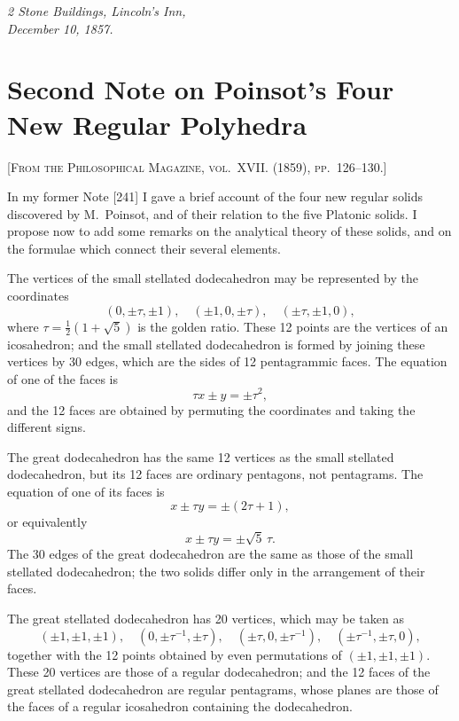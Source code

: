 \documentclass[11pt,a4paper]{book}
\begin{document}
\medskip
\noindent\textit{2 Stone Buildings, Lincoln's Inn,\\December 10, 1857.}

\newpage



\section{Second Note on Poinsot's Four New Regular Polyhedra}

\textsc{[From the Philosophical Magazine, vol.~XVII. (1859), pp.~126--130.]}
\label{paper:242}

\setcounter{page}{86}

In my former Note [241] I gave a brief account of the four new regular solids discovered by M.~Poinsot, and of their relation to the five Platonic solids. I propose now to add some remarks on the analytical theory of these solids, and on the formulae which connect their several elements.

The vertices of the small stellated dodecahedron may be represented by the coordinates
\[
(0, \pm\tau, \pm1), \quad (\pm1, 0, \pm\tau), \quad (\pm\tau, \pm1, 0),
\]
where $\tau = \frac{1}{2}(1+\sqrt{5})$ is the golden ratio. These 12 points are the vertices of an icosahedron; and the small stellated dodecahedron is formed by joining these vertices by 30 edges, which are the sides of 12 pentagrammic faces. The equation of one of the faces is
\[
\tau x \pm y = \pm\tau^2,
\]
and the 12 faces are obtained by permuting the coordinates and taking the different signs.

\setcounter{page}{87}

The great dodecahedron has the same 12 vertices as the small stellated dodecahedron, but its 12 faces are ordinary pentagons, not pentagrams. The equation of one of its faces is
\[
x \pm \tau y = \pm(2\tau+1),
\]
or equivalently
\[
x \pm \tau y = \pm\sqrt{5}\,\tau.
\]
The 30 edges of the great dodecahedron are the same as those of the small stellated dodecahedron; the two solids differ only in the arrangement of their faces.

The great stellated dodecahedron has 20 vertices, which may be taken as
\[
(\pm1, \pm1, \pm1), \quad (0, \pm\tau^{-1}, \pm\tau), \quad (\pm\tau, 0, \pm\tau^{-1}), \quad (\pm\tau^{-1}, \pm\tau, 0),
\]
together with the 12 points obtained by even permutations of $(\pm1, \pm1, \pm1)$. These 20 vertices are those of a regular dodecahedron; and the 12 faces of the great stellated dodecahedron are regular pentagrams, whose planes are those of the faces of a regular icosahedron containing the dodecahedron.
\end{document}
